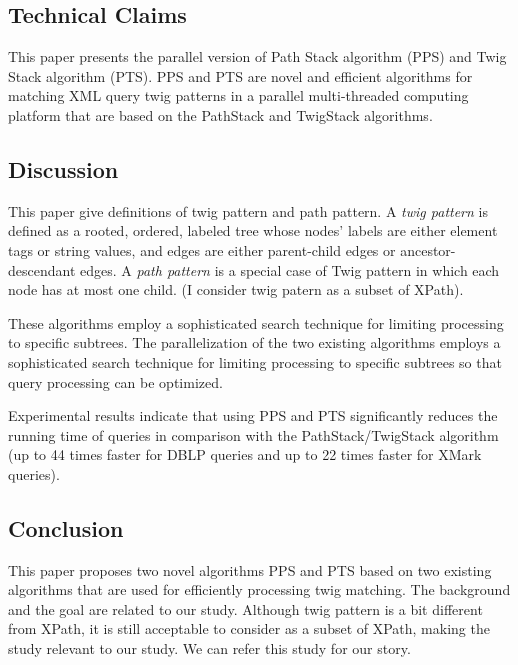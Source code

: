 \documentclass{paper}
\begin{document}
	\subsection{Technical Claims}
	
	This paper presents the parallel version of Path Stack algorithm (PPS) and Twig
	Stack algorithm (PTS). PPS and PTS are novel and efficient algorithms  for
	matching XML query twig patterns in a parallel multi-threaded  computing
	platform that are based on the PathStack and TwigStack algorithms. 
	
	
	\subsection{Discussion}
	
	This paper give definitions of twig pattern and path pattern. A \emph{twig pattern} 
	is defined as a rooted, ordered, labeled tree whose nodes’ labels are either
	element tags or string values, and edges are either parent-child edges or
	ancestor-descendant edges. A \emph{path pattern} is a special case of Twig pattern in
	which each node has at most one child. (I consider twig patern as a subset of XPath).
	
	These algorithms employ a sophisticated search technique for limiting processing
	to speciﬁc subtrees. The parallelization of the two existing algorithms employs
	a sophisticated search technique for limiting processing to speciﬁc subtrees so 
	that  query processing can be optimized.
	
	Experimental results indicate that using PPS and PTS signiﬁcantly reduces the
	running time of queries in comparison with the PathStack/TwigStack algorithm (up
	to 44 times faster for DBLP queries and up to 22 times faster for XMark
	queries).
	
	\subsection{Conclusion}
	
	This paper proposes two novel algorithms PPS and PTS based on two existing
	algorithms that are used for efficiently processing twig matching. The 
	background and the goal are related to our study. Although twig pattern is a 
	bit different from XPath, it is still acceptable to consider as a subset of 
	XPath, making the study relevant to our study. We can refer this study for 
	our story.
	
	 
	
	
\end{document}
